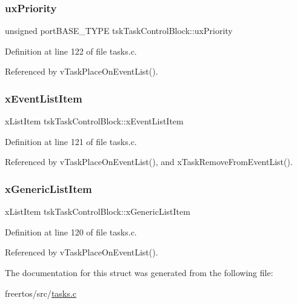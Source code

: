 \subsubsection{\texorpdfstring{ux\+Priority}{uxPriority}}
{\footnotesize\ttfamily unsigned port\+B\+A\+S\+E\+\_\+\+T\+Y\+PE tsk\+Task\+Control\+Block\+::ux\+Priority}



Definition at line 122 of file tasks.\+c.



Referenced by v\+Task\+Place\+On\+Event\+List().

\mbox{\label{structtskTaskControlBlock_a9b0ee1554f116853c7631dc0b585ffdc}} 
\subsubsection{\texorpdfstring{x\+Event\+List\+Item}{xEventListItem}}
{\footnotesize\ttfamily x\+List\+Item tsk\+Task\+Control\+Block\+::x\+Event\+List\+Item}



Definition at line 121 of file tasks.\+c.



Referenced by v\+Task\+Place\+On\+Event\+List(), and x\+Task\+Remove\+From\+Event\+List().

\mbox{\label{structtskTaskControlBlock_a95eb5853a94644043605770f63ac9a63}} 
\subsubsection{\texorpdfstring{x\+Generic\+List\+Item}{xGenericListItem}}
{\footnotesize\ttfamily x\+List\+Item tsk\+Task\+Control\+Block\+::x\+Generic\+List\+Item}



Definition at line 120 of file tasks.\+c.



Referenced by v\+Task\+Place\+On\+Event\+List().



The documentation for this struct was generated from the following file\+:\begin{DoxyCompactItemize}
\item 
freertos/src/\mbox{\hyperlink{tasks_8c}{tasks.\+c}}\end{DoxyCompactItemize}
